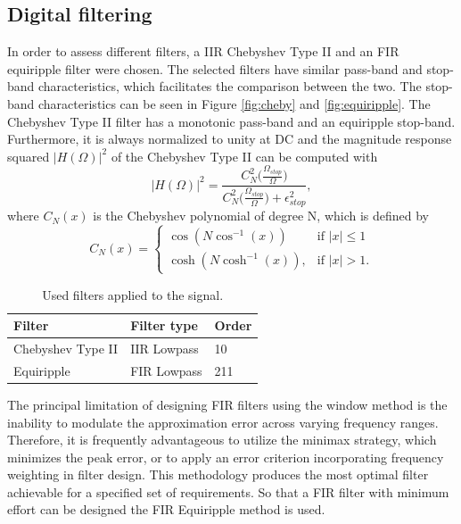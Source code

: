 \subsection{Digital filtering}
In order to assess different filters, a IIR Chebyshev Type II and an FIR equiripple filter were chosen. The selected filters have similar pass-band and stop-band characteristics, which facilitates the comparison between the two. The stop-band characteristics can be seen in Figure \ref{fig:cheby} and \ref{fig:equiripple}. The Chebyshev Type II filter has a monotonic pass-band and an equiripple stop-band. Furthermore, it is always normalized to unity at DC and the magnitude response squared $|H(\Omega)|^2$ of the Chebyshev Type II can be computed with \cite{orfanidis_introduction_1996}
\begin{equation}
	|H(\Omega)|^2 = \frac{C_N^2\big(\frac{\Omega_{stop}}{\Omega}\big)}{C_N^2\big(\frac{\Omega_{stop}}{\Omega}\big) + \epsilon_{stop}^2},
\end{equation}
where $C_N(x)$ is the Chebyshev polynomial of degree N, which is defined by
\begin{equation}
	C_N(x) =
	\begin{cases}
		 \cos(N\cos^{-1}(x))	    	& \text{if } |x| \le 1 \\
		\cosh(N\cosh^{-1}(x)),		& \text{if } |x| > 1.
	\end{cases}
\end{equation} 

\begin{table}%
	\caption{Used filters applied to the signal.}
	\centering %
	\begin{tabularx}{\linewidth}{l|l|X|} %
		\toprule
		Filter & Filter type & Order\\
		\midrule
		Chebyshev Type II & IIR Lowpass & 10 \\
		Equiripple  & FIR Lowpass & 211 \\
		\bottomrule
	\end{tabularx}
	\label{tab:packages}
\end{table} 

The principal limitation of designing FIR filters using the window method is the inability to modulate the approximation error across varying frequency ranges. Therefore, it is frequently advantageous to utilize the minimax strategy, which minimizes the peak error, or to apply an error criterion incorporating frequency weighting in filter design. This methodology produces the most optimal filter achievable for a specified set of requirements. So that a FIR filter with minimum effort can be designed the FIR Equiripple method is used. \cite{noauthor_introduction_nodate} 

